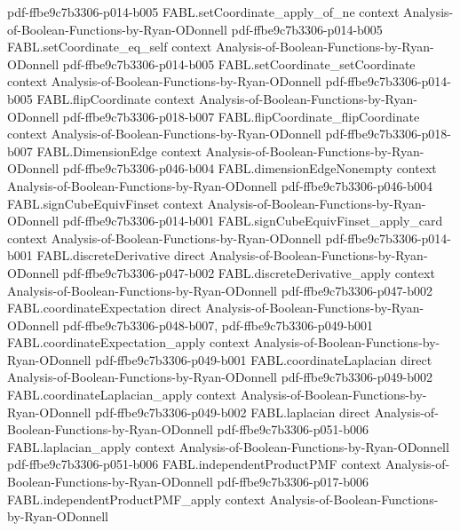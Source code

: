 \begin{theorem}
  {pdf-ffbe9c7b3306-p014-b005}
\proofstep
  {FABL.setCoordinate_apply_of_ne}
  {context}
  {Analysis-of-Boolean-Functions-by-Ryan-ODonnell}
  {pdf-ffbe9c7b3306-p014-b005}
\proofstep
  {FABL.setCoordinate_eq_self}
  {context}
  {Analysis-of-Boolean-Functions-by-Ryan-ODonnell}
  {pdf-ffbe9c7b3306-p014-b005}
\proofstep
  {FABL.setCoordinate_setCoordinate}
  {context}
  {Analysis-of-Boolean-Functions-by-Ryan-ODonnell}
  {pdf-ffbe9c7b3306-p014-b005}
\proofstep
  {FABL.flipCoordinate}
  {context}
  {Analysis-of-Boolean-Functions-by-Ryan-ODonnell}
  {pdf-ffbe9c7b3306-p018-b007}
\proofstep
  {FABL.flipCoordinate_flipCoordinate}
  {context}
  {Analysis-of-Boolean-Functions-by-Ryan-ODonnell}
  {pdf-ffbe9c7b3306-p018-b007}
\proofstep
  {FABL.DimensionEdge}
  {context}
  {Analysis-of-Boolean-Functions-by-Ryan-ODonnell}
  {pdf-ffbe9c7b3306-p046-b004}
\proofstep
  {FABL.dimensionEdgeNonempty}
  {context}
  {Analysis-of-Boolean-Functions-by-Ryan-ODonnell}
  {pdf-ffbe9c7b3306-p046-b004}
\proofstep
  {FABL.signCubeEquivFinset}
  {context}
  {Analysis-of-Boolean-Functions-by-Ryan-ODonnell}
  {pdf-ffbe9c7b3306-p014-b001}
\proofstep
  {FABL.signCubeEquivFinset_apply_card}
  {context}
  {Analysis-of-Boolean-Functions-by-Ryan-ODonnell}
  {pdf-ffbe9c7b3306-p014-b001}
\proofstep
  {FABL.discreteDerivative}
  {direct}
  {Analysis-of-Boolean-Functions-by-Ryan-ODonnell}
  {pdf-ffbe9c7b3306-p047-b002}
\proofstep
  {FABL.discreteDerivative_apply}
  {context}
  {Analysis-of-Boolean-Functions-by-Ryan-ODonnell}
  {pdf-ffbe9c7b3306-p047-b002}
\proofstep
  {FABL.coordinateExpectation}
  {direct}
  {Analysis-of-Boolean-Functions-by-Ryan-ODonnell}
  {pdf-ffbe9c7b3306-p048-b007,
    pdf-ffbe9c7b3306-p049-b001}
\proofstep
  {FABL.coordinateExpectation_apply}
  {context}
  {Analysis-of-Boolean-Functions-by-Ryan-ODonnell}
  {pdf-ffbe9c7b3306-p049-b001}
\proofstep
  {FABL.coordinateLaplacian}
  {direct}
  {Analysis-of-Boolean-Functions-by-Ryan-ODonnell}
  {pdf-ffbe9c7b3306-p049-b002}
\proofstep
  {FABL.coordinateLaplacian_apply}
  {context}
  {Analysis-of-Boolean-Functions-by-Ryan-ODonnell}
  {pdf-ffbe9c7b3306-p049-b002}
\proofstep
  {FABL.laplacian}
  {direct}
  {Analysis-of-Boolean-Functions-by-Ryan-ODonnell}
  {pdf-ffbe9c7b3306-p051-b006}
\proofstep
  {FABL.laplacian_apply}
  {context}
  {Analysis-of-Boolean-Functions-by-Ryan-ODonnell}
  {pdf-ffbe9c7b3306-p051-b006}
\proofstep
  {FABL.independentProductPMF}
  {context}
  {Analysis-of-Boolean-Functions-by-Ryan-ODonnell}
  {pdf-ffbe9c7b3306-p017-b006}
\proofstep
  {FABL.independentProductPMF_apply}
  {context}
  {Analysis-of-Boolean-Functions-by-Ryan-ODonnell}

\end{theorem}
